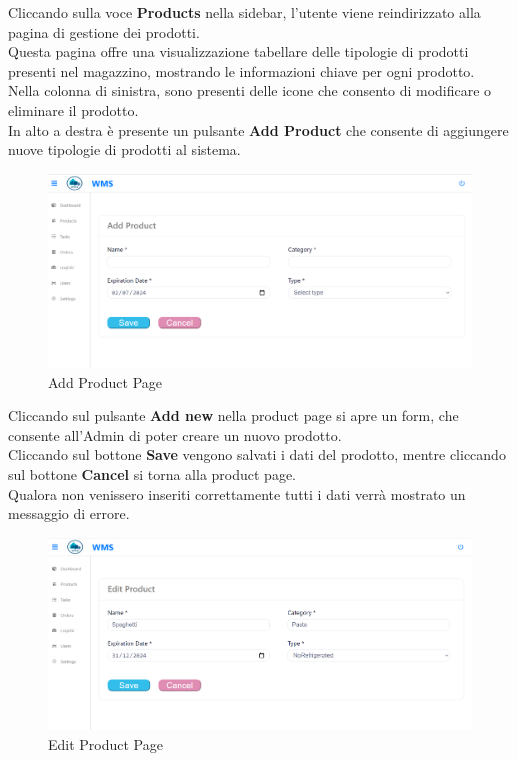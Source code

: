 Cliccando sulla voce \textbf{Products} nella sidebar, l'utente viene reindirizzato alla pagina di gestione dei prodotti.\\
Questa pagina offre una visualizzazione tabellare delle tipologie di prodotti presenti nel magazzino,
mostrando le informazioni chiave per ogni prodotto.\\
Nella colonna di sinistra, sono presenti delle icone che consento di modificare o eliminare il prodotto.\\
In alto a destra è presente un pulsante \textbf{Add Product} che consente di aggiungere nuove tipologie di prodotti al sistema.

\begin{figure}[H]
    \centering
    \includegraphics[width=\textwidth]{document/sections/img/Storyboard/addProductPage.png}
    \caption{Add Product Page}
    \label{fig:addProductPages}
\end{figure}

Cliccando sul pulsante \textbf{Add new} nella product page si apre un form, che consente
all'Admin di poter creare un nuovo prodotto.\\
Cliccando sul bottone \textbf{Save} vengono salvati i dati del prodotto, mentre cliccando sul bottone \textbf{Cancel} si torna alla product page.\\
Qualora non venissero inseriti correttamente tutti i dati verrà mostrato un messaggio di errore.

\begin{figure}[H]
    \centering
    \includegraphics[width=\textwidth]{document/sections/img/Storyboard/editProductPage.png}
    \caption{Edit Product Page}
    \label{fig:editProductPage}
\end{figure}


